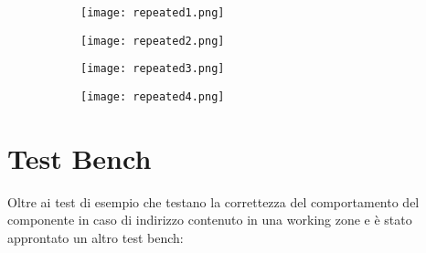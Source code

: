 \documentclass [a4paper, 12pt]{article}
\begin{document}
\begin{figure}[H]

\begin{subfigure}{\textwidth}
\texttt{[image: repeated1.png]} 
\caption{}
\label{fig:subim1}
\end{subfigure}
\begin{subfigure}{1\textwidth}
\texttt{[image: repeated2.png]}
\caption{}
\label{fig:subim2}
\end{subfigure}
\begin{subfigure}{1\textwidth}
\texttt{[image: repeated3.png]}
\caption{}
\label{fig:subim3}
\end{subfigure}
\begin{subfigure}{1\textwidth}
\texttt{[image: repeated4.png]}
\caption{}
\label{fig:subim4}
\end{subfigure}

\label{fig:image2}
\end{figure}

\newpage

\section{Test Bench}
Oltre ai test di esempio che testano la correttezza del comportamento del componente in caso di indirizzo contenuto in una working zone e \`e stato approntato un altro test bench:
\end{document}

